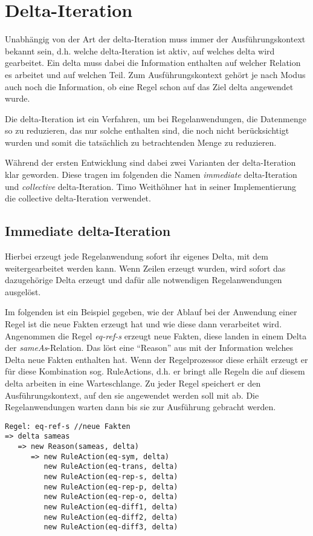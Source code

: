 \section{Delta-Iteration}
\label{abschnitt-delta-iteration}

Unabhängig von der Art der delta-Iteration muss immer der Ausführungskontext bekannt sein, d.h. welche delta-Iteration ist aktiv, auf welches delta wird gearbeitet. Ein delta muss dabei die Information enthalten auf welcher Relation es arbeitet und auf welchen Teil. Zum Ausführungskontext gehört je nach Modus auch noch die Information, ob eine Regel schon auf das Ziel delta angewendet wurde.

Die delta-Iteration ist ein Verfahren, um bei Regelanwendungen, die Datenmenge so zu reduzieren, das nur solche enthalten sind, die noch nicht berücksichtigt wurden und somit die tatsächlich zu betrachtenden Menge zu reduzieren.

Während der ersten Entwicklung sind dabei zwei Varianten der delta-Iteration klar geworden. Diese tragen im folgenden die Namen \emph{immediate} delta-Iteration und \emph{collective} delta-Iteration. Timo Weithöhner hat in seiner Implementierung die collective delta-Iteration verwendet.

\subsection{Immediate delta-Iteration}

Hierbei erzeugt jede Regelanwendung sofort ihr eigenes Delta, mit dem weitergearbeitet werden kann. Wenn Zeilen erzeugt wurden, wird sofort das dazugehörige Delta erzeugt und dafür alle notwendigen Regelanwendungen ausgelöst.

Im folgenden ist ein Beispiel gegeben, wie der Ablauf bei der Anwendung einer Regel ist die neue Fakten erzeugt hat und wie diese dann verarbeitet wird. Angenommen die Regel \emph{eq-ref-s} erzeugt neue Fakten, diese landen in einem Delta der \emph{sameAs}-Relation. Das löst eine ``Reason'' aus mit der Information welches Delta neue Fakten enthalten hat. Wenn der Regelprozessor diese erhält erzeugt er für diese Kombination sog. RuleActions, d.h. er bringt alle Regeln die auf diesem delta arbeiten in eine Warteschlange. Zu jeder Regel speichert er den Ausführungskontext, auf den sie angewendet werden soll mit ab. Die Regelanwendungen warten dann bis sie zur Ausführung gebracht werden.

\begin{verbatim}
Regel: eq-ref-s //neue Fakten
=> delta sameas
   => new Reason(sameas, delta)
      => new RuleAction(eq-sym, delta)
         new RuleAction(eq-trans, delta)
         new RuleAction(eq-rep-s, delta)
         new RuleAction(eq-rep-p, delta)
         new RuleAction(eq-rep-o, delta)
         new RuleAction(eq-diff1, delta)
         new RuleAction(eq-diff2, delta)
         new RuleAction(eq-diff3, delta)
\end{verbatim}

